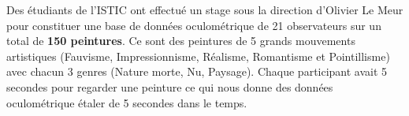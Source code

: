 Des étudiants de l'ISTIC ont effectué un stage sous la direction d'Olivier Le Meur pour constituer une base de données oculométrique de 21 observateurs sur un total de \textbf{150 peintures}. Ce sont des peintures de 5 grands mouvements artistiques (Fauvisme, Impressionnisme, Réalisme, Romantisme et Pointillisme) avec chacun 3 genres (Nature morte, Nu, Paysage). Chaque participant avait 5 secondes pour regarder une peinture ce qui nous donne des données oculométrique étaler de 5 secondes dans le temps.